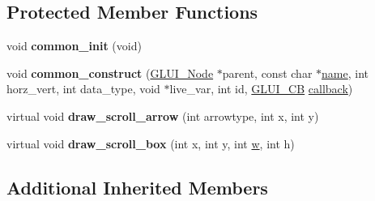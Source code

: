 \subsection*{Protected Member Functions}
\begin{DoxyCompactItemize}
\item 
\hypertarget{classGLUI__Scrollbar_a09f3f6af3b4681b15ed06ce704963e87}{void {\bfseries common\-\_\-init} (void)}\label{classGLUI__Scrollbar_a09f3f6af3b4681b15ed06ce704963e87}

\item 
\hypertarget{classGLUI__Scrollbar_a5973db7a6e64d46a0e991bfe75dd375d}{void {\bfseries common\-\_\-construct} (\hyperlink{classGLUI__Node}{G\-L\-U\-I\-\_\-\-Node} $\ast$parent, const char $\ast$\hyperlink{classGLUI__Control_aa95b97d50df45335fc33f0af03958eb3}{name}, int horz\-\_\-vert, int data\-\_\-type, void $\ast$live\-\_\-var, int id, \hyperlink{classGLUI__CB}{G\-L\-U\-I\-\_\-\-C\-B} \hyperlink{classGLUI__Control_a96060fe0cc6d537e736dd6eef78e24ab}{callback})}\label{classGLUI__Scrollbar_a5973db7a6e64d46a0e991bfe75dd375d}

\item 
\hypertarget{classGLUI__Scrollbar_a19a0e1f68295556be9cb2a082b88df41}{virtual void {\bfseries draw\-\_\-scroll\-\_\-arrow} (int arrowtype, int x, int y)}\label{classGLUI__Scrollbar_a19a0e1f68295556be9cb2a082b88df41}

\item 
\hypertarget{classGLUI__Scrollbar_ac85ec65614a19f146b2f0f2fef506df3}{virtual void {\bfseries draw\-\_\-scroll\-\_\-box} (int x, int y, int \hyperlink{classGLUI__Control_aca82a099b9cbbadb188794cbfb06aa27}{w}, int h)}\label{classGLUI__Scrollbar_ac85ec65614a19f146b2f0f2fef506df3}

\end{DoxyCompactItemize}
\subsection*{Additional Inherited Members}


